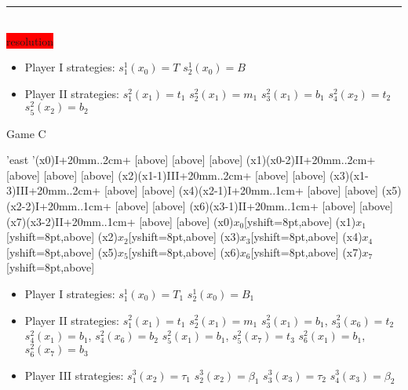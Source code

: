 \documentclass[10pt]{report}
\newenvironment{exercise}[1]
    {\vspace{0.5cm}\hrule\vspace{0.5cm}\noindent\fbox{#1}\\}
    {\vspace{0.5cm}}
\newenvironment{response}
{\vspace{0.2cm}\noindent\colorbox{red}{resolution}}
    {\vspace{0.5cm}}
\begin{document}
\begin{exercise}{3.5}
\begin{response}
		\begin{itemize}
			\item Player I strategies:
			      \subitem $s_{1}^{1}(x_{0}) = T$
			      \subitem $s_{2}^{1}(x_{0}) = B$
			\item Player II strategies:
			      \subitem $s_{1}^{2}(x_{1}) = t_{1}$
			      \subitem $s_{2}^{2}(x_{1}) = m_{1}$
			      \subitem $s_{3}^{2}(x_{1}) = b_{1}$
			      \subitem $s_{4}^{2}(x_{2}) = t_{2}$
			      \subitem $s_{5}^{2}(x_{2}) = b_{2}$
		\end{itemize}

		\vspace{0.5cm}
		Game C\\
		\vspace{0.5cm}
		\begin{istgame}[sloped,font=\tiny]
			\setistgrowdirection'{east}
			\setistOvalNodeStyle{.6cm}
			\istrooto'(x0){I}+{20mm}..{2cm}+
			[above]
			[above]
			[above]
			\endist
			\xtShowEndPoints[oval node, minimum size=6pt]
			\xtdistance{20mm}{10mm}
			\istrooto(x1)(x0-2){II}+{20mm}..{2cm}+
			[above]
			[above]
			[above]
			\endist
			\istrooto(x2)(x1-1){III}+{20mm}..{2cm}+
			[above]
			[above]
			\endist
			\istrooto(x3)(x1-3){III}+{20mm}..{2cm}+
			[above]
			[above]
			\endist
			\istrooto(x4)(x2-1){I}+{20mm}..{1cm}+
			[above]
			[above]
			\endist
			\istrooto(x5)(x2-2){I}+{20mm}..{1cm}+
			[above]
			[above]
			\endist
			\istrooto(x6)(x3-1){II}+{20mm}..{1cm}+
			[above]
			[above]
			\endist
			\istrooto(x7)(x3-2){II}+{20mm}..{1cm}+
			[above]
			[above]
			\endist
			\xtOwner(x0){$x_{0}$}[yshift=8pt,above]
			\xtOwner(x1){$x_{1}$}[yshift=8pt,above]
			\xtOwner(x2){$x_{2}$}[yshift=8pt,above]
			\xtOwner(x3){$x_{3}$}[yshift=8pt,above]
			\xtOwner(x4){$x_{4}$}[yshift=8pt,above]
			\xtOwner(x5){$x_{5}$}[yshift=8pt,above]
			\xtOwner(x6){$x_{6}$}[yshift=8pt,above]
			\xtOwner(x7){$x_{7}$}[yshift=8pt,above]
		\end{istgame}

		\begin{itemize}
			\item Player I strategies:
			      \subitem $s_{1}^{1}(x_{0}) = T_{1}$
			      \subitem $s_{2}^{1}(x_{0}) = B_{1}$
			\item Player II strategies:
			      \subitem $s_{1}^{2}(x_{1}) = t_{1}$
			      \subitem $s_{2}^{2}(x_{1}) = m_{1}$
			      \subitem $s_{3}^{2}(x_{1}) = b_{1}$, $s_{3}^{2}(x_{6}) = t_{2}$
			      \subitem $s_{4}^{2}(x_{1}) = b_{1}$, $s_{4}^{2}(x_{6}) = b_{2}$
			      \subitem $s_{5}^{2}(x_{1}) = b_{1}$, $s_{5}^{2}(x_{7}) = t_{3}$
			      \subitem $s_{6}^{2}(x_{1}) = b_{1}$, $s_{6}^{2}(x_{7}) = b_{3}$
			\item Player III strategies:
			      \subitem $s_{1}^{3}(x_{2}) = \tau_{1}$
			      \subitem $s_{2}^{3}(x_{2}) = \beta_{1}$
			      \subitem $s_{3}^{3}(x_{3}) = \tau_{2}$
			      \subitem $s_{4}^{3}(x_{3}) = \beta_{2}$
		\end{itemize}


\end{response}
\end{exercise}
\end{document}
